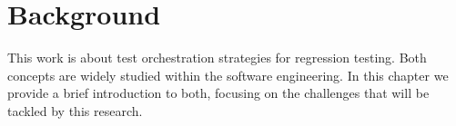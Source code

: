 \chapter{Background}\label{chap:background}

This work is about test orchestration strategies for regression testing.
Both concepts are widely studied within the software engineering.
In this chapter we provide a brief introduction to both, focusing on the challenges that will be tackled by this research.



%



